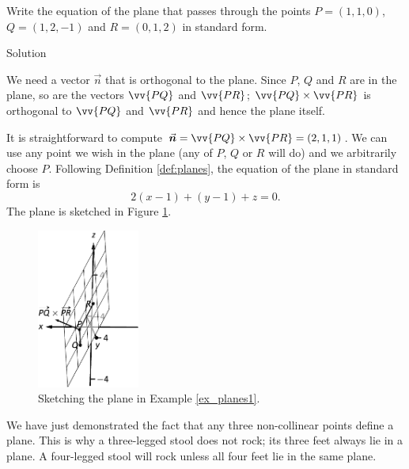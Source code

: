 \begin{example}\label{ex_planes1}
Write the equation of the plane that passes through the points $P=(1,1,0)$, $Q = (1,2,-1)$ and $R = (0,1,2)$ in standard form.

Solution 

We need a vector $\vec n$ that is orthogonal to the plane. Since $P$, $Q$ and $R$ are in the plane, so are the vectors $\vv{PQ}$ and $\vv{PR}$; $\vv{PQ}\times\vv{PR}$ is orthogonal to $\vv{PQ}$ and $\vv{PR}$ and hence the plane itself.

It is straightforward to compute $\vec n = \vv{PQ}\times\vv{PR} = ( 2,1,1)$. We can use any point we wish in the plane (any of $P$, $Q$ or $R$ will do) and we arbitrarily choose $P$. Following Definition \ref{def:planes}, the equation of the plane in standard form is 
$$2(x-1) + (y-1)+z = 0.$$
The plane is sketched in Figure \ref{fig_ana_geo_5}.


\begin{figure}[H]
	\begin{center}
			\includegraphics[width=0.3\textwidth]{fig_ana_geo_5}
	\caption{Sketching the plane in Example \ref{ex_planes1}.}
	\label{fig_ana_geo_5}
	\end{center}
\end{figure}

\end{example}

We have just demonstrated the fact that any three non-collinear points define a plane. This is why a three-legged stool does not rock; its three feet always lie in a plane. A four-legged stool will rock unless all four feet lie in the same plane.


